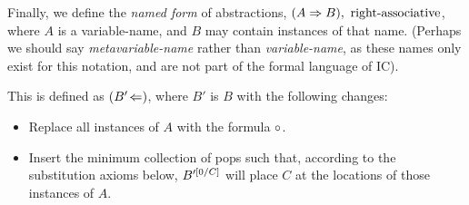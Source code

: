 \documentclass{article}
\begin{document}
  Finally, we define the \emph{named form} of abstractions, $(\nameabst{A}B),\ \operatorname{right-associative}$, where $A$ is a variable-name, and $B$ may contain instances of that name. (Perhaps we should say \emph{metavariable-name} rather than \emph{variable-name}, as these names only exist for this notation, and are not part of the formal language of IC).
  
  This is defined as $(B'\!\Leftarrow)$, where $B'$ is $B$ with the following changes:
  \begin{itemize}
    \item Replace all instances of $A$ with the formula $\circ$.
    \item Insert the minimum collection of pops such that, according to the substitution axioms below, $B'^{[{0}{/}{C}]}$ will place $C$ at the locations of those instances of $A$.
  \end{itemize}
\end{document}
